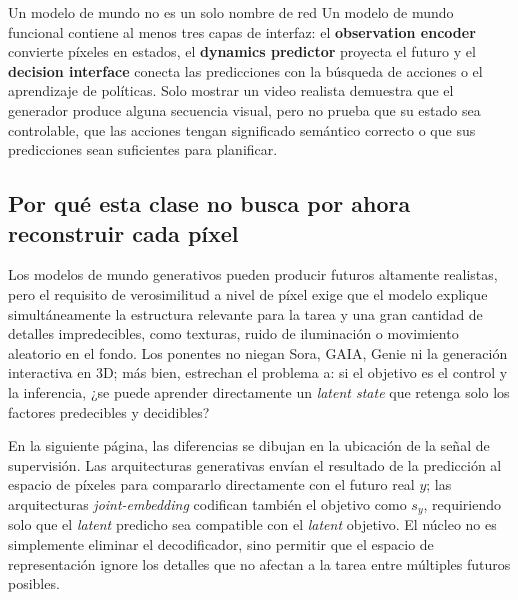 
\begin{importantbox}{Un modelo de mundo no es un solo nombre de red}
Un modelo de mundo funcional contiene al menos tres capas de interfaz: el \textbf{observation encoder} convierte píxeles en estados, el \textbf{dynamics predictor} proyecta el futuro y el \textbf{decision interface} conecta las predicciones con la búsqueda de acciones o el aprendizaje de políticas. Solo mostrar un video realista demuestra que el generador produce alguna secuencia visual, pero no prueba que su estado sea controlable, que las acciones tengan significado semántico correcto o que sus predicciones sean suficientes para planificar.
\end{importantbox}

\subsection{Por qué esta clase no busca por ahora reconstruir cada píxel}

Los modelos de mundo generativos pueden producir futuros altamente realistas, pero el requisito de verosimilitud a nivel de píxel exige que el modelo explique simultáneamente la estructura relevante para la tarea y una gran cantidad de detalles impredecibles, como texturas, ruido de iluminación o movimiento aleatorio en el fondo. Los ponentes no niegan Sora, GAIA, Genie ni la generación interactiva en 3D; más bien, estrechan el problema a: si el objetivo es el control y la inferencia, ¿se puede aprender directamente un \textit{latent state} que retenga solo los factores predecibles y decidibles?


En la siguiente página, las diferencias se dibujan en la ubicación de la señal de supervisión. Las arquitecturas generativas envían el resultado de la predicción al espacio de píxeles para compararlo directamente con el futuro real $y$; las arquitecturas \textit{joint-embedding} codifican también el objetivo como $s_y$, requiriendo solo que el \textit{latent} predicho sea compatible con el \textit{latent} objetivo. El núcleo no es simplemente eliminar el decodificador, sino permitir que el espacio de representación ignore los detalles que no afectan a la tarea entre múltiples futuros posibles.

